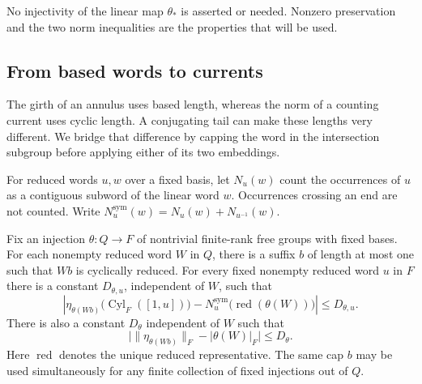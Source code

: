 No injectivity of the linear map $\theta_*$ is asserted or needed.
Nonzero preservation and the two norm inequalities are the properties
that will be used.

\subsection{From based words to currents}

The girth of an annulus uses based length, whereas the norm of a
counting current uses cyclic length.  A conjugating tail can make
these lengths very different.  We bridge that difference by capping
the word in the intersection subgroup before applying either of its
two embeddings.

For reduced words $u,w$ over a fixed basis, let $N_u(w)$ count the
occurrences of $u$ as a contiguous subword of the linear word $w$.
Occurrences crossing an end are not counted.  Write
$N_u^{\mathrm{sym}}(w)=N_u(w)+N_{u^{-1}}(w)$.

\begin{lemma}
\label{ann:capping}
Fix an injection $\theta\colon Q\to F$ of nontrivial finite-rank
free groups with fixed bases.  For each nonempty reduced word $W$ in
$Q$, there is a suffix $b$ of length at most one such that $Wb$ is
cyclically reduced.  For every fixed nonempty reduced word $u$ in $F$
there is a constant $D_{\theta,u}$, independent of $W$, such that
\begin{equation}
 \left|\eta_{\theta(Wb)}
       \bigl(\operatorname{Cyl}_F([1,u])\bigr)
       -N_u^{\mathrm{sym}}\bigl(\operatorname{red}(\theta(W))\bigr)
 \right|\leq D_{\theta,u}.
 \label{ann:capping-frequency}
\end{equation}
There is also a constant $D_\theta$ independent of $W$ such that
\begin{equation}
 \bigl|\|\eta_{\theta(Wb)}\|_F-|\theta(W)|_F\bigr|
 \leq D_\theta.
 \label{ann:capping-length}
\end{equation}
Here $\operatorname{red}$ denotes the unique reduced representative.
The same cap $b$ may be used simultaneously for any finite collection
of fixed injections out of $Q$.
\end{lemma}

